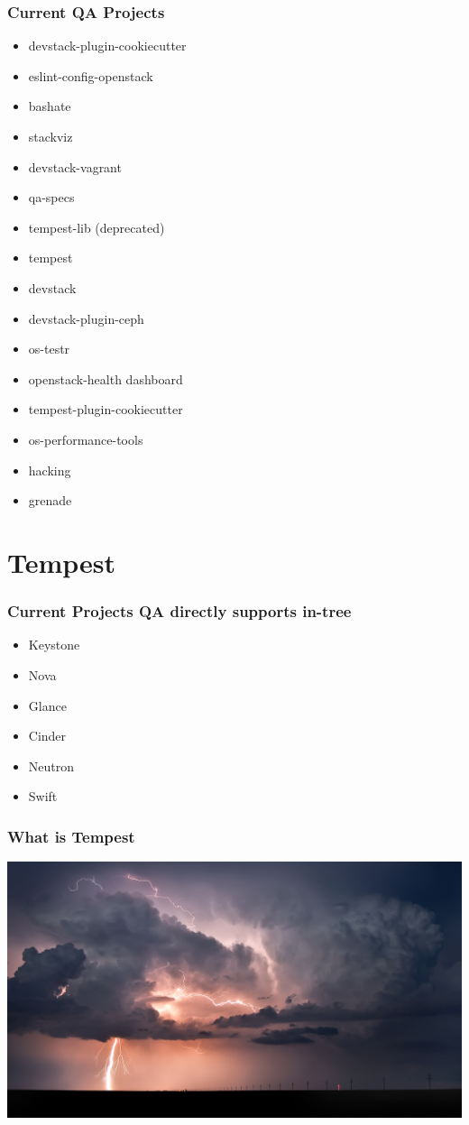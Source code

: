 \documentclass[aspectratio=169,11pt,hyperref={colorlinks=true}]{beamer}
\begin{document}
\begin{frame}
    \frametitle{Current QA Projects}
    \begin{itemize}
        \item{devstack-plugin-cookiecutter}
        \item{eslint-config-openstack}
        \item{bashate}
        \item{stackviz}
        \item{devstack-vagrant}
        \item{qa-specs}
        \item{tempest-lib (deprecated)}
        \item{tempest}
        \item{devstack}
        \item{devstack-plugin-ceph}
        \item{os-testr}
        \item{openstack-health dashboard}
        \item{tempest-plugin-cookiecutter}
        \item{os-performance-tools}
        \item{hacking}
        \item{grenade}
    \end{itemize}
\end{frame}

\section{Tempest}
\begin{frame}
    \frametitle{Current Projects QA directly supports in-tree}
    \begin{itemize}
        \item Keystone
        \item Nova
        \item Glance
        \item Cinder
        \item Neutron
        \item Swift
    \end{itemize}
\end{frame}

\begin{frame}[c]
    \frametitle{What is Tempest}
    \begin{center}
    	\includegraphics[width=1.0\textwidth]{tempest.jpg}
    \end{center}
\end{frame}
\end{document}
